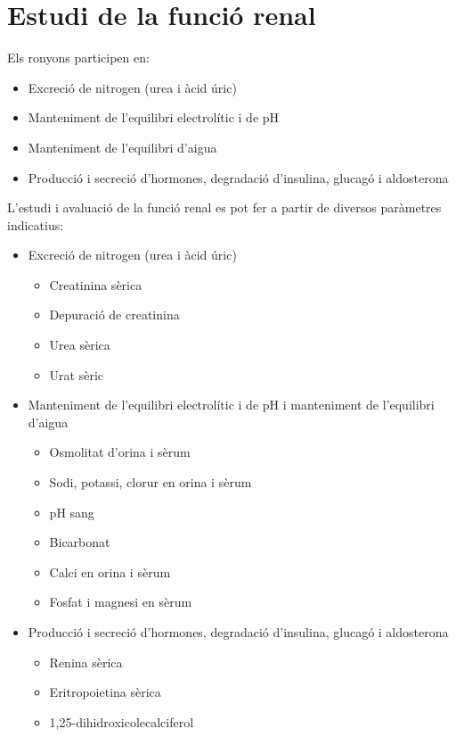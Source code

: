 \section{Estudi de la funció renal}
\label{sec:estudi-de-la}

Els ronyons participen en:
\begin{itemize}
\item Excreció de nitrogen (urea i àcid úric)
\item Manteniment de l'equilibri electrolític i de pH
\item Manteniment de l'equilibri d'aigua
\item Producció i secreció d'hormones, degradació d'insulina, glucagó i aldosterona
\end{itemize}

L'estudi i avaluació de la funció renal es pot fer a partir de diversos paràmetres indicatius:
\begin{itemize}
\item Excreció de nitrogen (urea i àcid úric)
  \begin{itemize}
  \item Creatinina sèrica
  \item Depuració de creatinina
  \item Urea sèrica
  \item Urat sèric
  \end{itemize}
\item Manteniment de l'equilibri electrolític i de pH i manteniment de l'equilibri d'aigua
  \begin{itemize}
  \item Osmolitat d'orina i sèrum
  \item Sodi, potassi, clorur en orina i sèrum
  \item pH sang
  \item Bicarbonat
  \item Calci en orina i sèrum
  \item Fosfat i magnesi en sèrum
  \end{itemize}
\item Producció i secreció d'hormones, degradació d'insulina, glucagó i aldosterona
  \begin{itemize}
  \item Renina sèrica
  \item Eritropoietina sèrica
  \item 1,25-dihidroxicolecalciferol
  \end{itemize}
\end{itemize}

